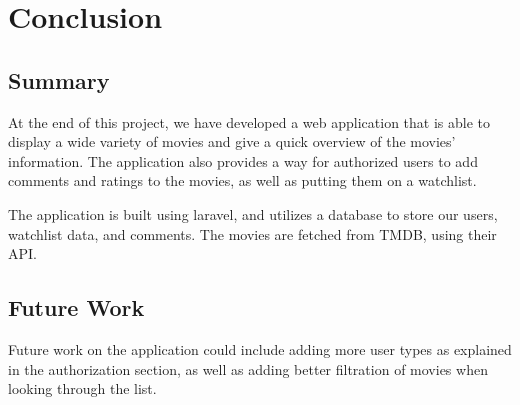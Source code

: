 \section{Conclusion}

\subsection{Summary}
At the end of this project, we have developed a web application
that is able to display a wide variety of movies and give a quick overview of the movies' information. 
The application also provides a way for authorized users to add comments and ratings to the movies, 
as well as putting them on a watchlist.\newline

The application is built using laravel, and utilizes a database to store our users, 
watchlist data, and comments. The movies are fetched from TMDB, using their API. \newline

\subsection{Future Work}
Future work on the application could include adding more user types as explained in the authorization section, 
as well as adding better filtration of movies when looking through the list. \newline